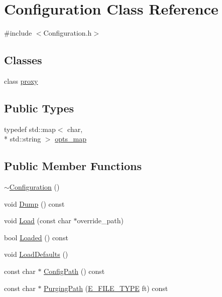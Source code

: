 \section{Configuration Class Reference}
\label{class_configuration}


{\ttfamily \#include $<$Configuration.\-h$>$}

\subsection*{Classes}
\begin{DoxyCompactItemize}
\item 
class \hyperlink{class_configuration_1_1proxy}{proxy}
\end{DoxyCompactItemize}
\subsection*{Public Types}
\begin{DoxyCompactItemize}
\item 
typedef std\-::map$<$ char, \\*
std\-::string $>$ \hyperlink{class_configuration_a70a439c19649766a6bb0f02656d1b7ce}{opts\-\_\-map}
\end{DoxyCompactItemize}
\subsection*{Public Member Functions}
\begin{DoxyCompactItemize}
\item 
\hyperlink{class_configuration_a0dd0fa189e239f4c9a036303f641441e}{$\sim$\-Configuration} ()
\item 
void \hyperlink{class_configuration_a140c4da69923cd29865636f696df6ed4}{Dump} () const 
\item 
void \hyperlink{class_configuration_a02d4eee5b4b35f788d1ccf78b471f152}{Load} (const char $\ast$override\-\_\-path)
\item 
bool \hyperlink{class_configuration_a95bdf92ada17c215b8fe65413c74e41d}{Loaded} () const 
\item 
void \hyperlink{class_configuration_aa898df0f55c531db1d80b3fb557225a4}{Load\-Defaults} ()
\item 
const char $\ast$ \hyperlink{class_configuration_ab6b05eab22cf6afb48d10609428b5774}{Config\-Path} () const 
\item 
const char $\ast$ \hyperlink{class_configuration_ab9ee5418161fb930e5bc6146cc7f043f}{Purging\-Path} (\hyperlink{_file_parser_8h_a77516d1e52649fa212cc16893769cf63}{E\-\_\-\-F\-I\-L\-E\-\_\-\-T\-Y\-P\-E} ft) const 
\end{DoxyCompactItemize}
